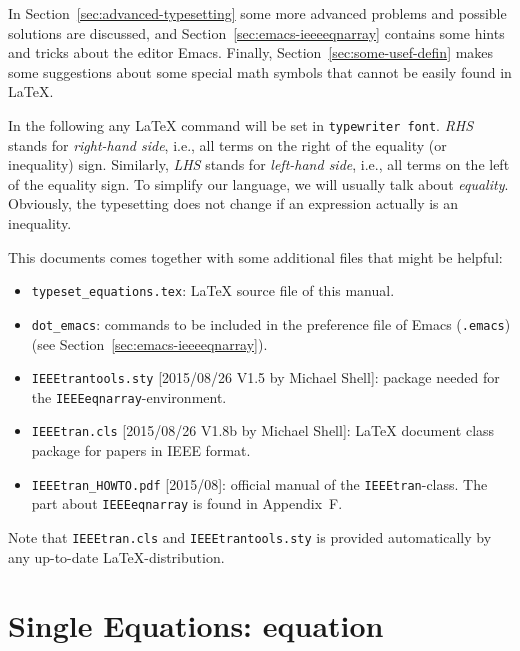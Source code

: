 \documentclass[a4paper,11pt]{article}
\begin{document}
In Section~\ref{sec:advanced-typesetting} some more advanced problems
and possible solutions are discussed, and
Section~\ref{sec:emacs-ieeeeqnarray} contains some hints and tricks
about the editor Emacs. Finally, Section~\ref{sec:some-usef-defin}
makes some suggestions about some special math symbols that cannot be
easily found in \LaTeX{}.

In the following any \LaTeX{} command will be set in
\verb+typewriter font+.  \emph{RHS} stands for \emph{right-hand side},
i.e., all terms on the right of the equality (or inequality)
sign. Similarly, \emph{LHS} stands for \emph{left-hand side}, i.e.,
all terms on the left of the equality sign. To simplify our language,
we will usually talk about \emph{equality}. Obviously, the typesetting
does not change if an expression actually is an inequality.

This documents comes together with some additional files that might be
helpful:
\begin{itemize}
\item \verb+typeset_equations.tex+: \LaTeX{} source file of this
  manual.

\item \verb+dot_emacs+: commands to be included in the preference file
  of Emacs (\verb+.emacs+) (see Section~\ref{sec:emacs-ieeeeqnarray}).

\item \verb+IEEEtrantools.sty+ [2015/08/26 V1.5 by Michael Shell]:
  package needed for the \verb+IEEEeqnarray+-environment. 

\item \verb+IEEEtran.cls+ [2015/08/26 V1.8b by Michael Shell]:
  \LaTeX{} document class package for papers in IEEE format.

\item \verb+IEEEtran_HOWTO.pdf+ [2015/08]: official manual of the
  \verb+IEEEtran+-class. The part about \verb+IEEEeqnarray+ is found
  in Appendix~F.

\end{itemize}
Note that \verb+IEEEtran.cls+ and \verb+IEEEtrantools.sty+ is provided
automatically by any up-to-date \LaTeX{}-distribution.


\section{Single Equations: equation}
\label{sec:equation}
\end{document}
